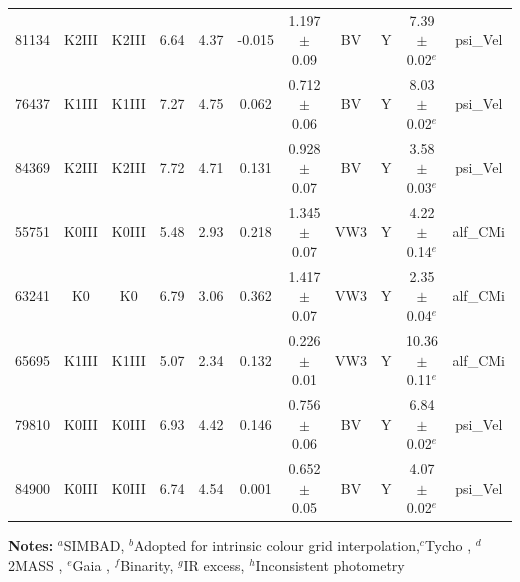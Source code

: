 \begin{tabular}{ccccccccccc}
81134 & K2III & K2III & 6.64 & 4.37 & -0.015 & 1.197 $\pm$ 0.09 & BV & Y & 7.39 $\pm$ 0.02$^e$ &psi_Vel\\
76437 & K1III & K1III & 7.27 & 4.75 & 0.062 & 0.712 $\pm$ 0.06 & BV & Y & 8.03 $\pm$ 0.02$^e$ &psi_Vel\\
84369 & K2III & K2III & 7.72 & 4.71 & 0.131 & 0.928 $\pm$ 0.07 & BV & Y & 3.58 $\pm$ 0.03$^e$ &psi_Vel\\
55751 & K0III & K0III & 5.48 & 2.93 & 0.218 & 1.345 $\pm$ 0.07 & VW3 & Y & 4.22 $\pm$ 0.14$^e$ &alf_CMi\\
63241 & K0 & K0 & 6.79 & 3.06 & 0.362 & 1.417 $\pm$ 0.07 & VW3 & Y & 2.35 $\pm$ 0.04$^e$ &alf_CMi\\
65695 & K1III & K1III & 5.07 & 2.34 & 0.132 & 0.226 $\pm$ 0.01 & VW3 & Y & 10.36 $\pm$ 0.11$^e$ &alf_CMi\\
79810 & K0III & K0III & 6.93 & 4.42 & 0.146 & 0.756 $\pm$ 0.06 & BV & Y & 6.84 $\pm$ 0.02$^e$ &psi_Vel\\
84900 & K0III & K0III & 6.74 & 4.54 & 0.001 & 0.652 $\pm$ 0.05 & BV & Y & 4.07 $\pm$ 0.02$^e$ &psi_Vel\\
\hline
\end{tabular}
\begin{minipage}{\linewidth}
\vspace{0.1cm}
\textbf{Notes:} $^a$SIMBAD, $^b$Adopted for intrinsic colour grid interpolation,$^c$Tycho \citet{hog_tycho-2_2000}, $^d$2MASS \citet{skrutskie_two_2006}, $^e$Gaia \citet{brown_gaia_2018}, $^f$Binarity, $^g$IR excess, $^h$Inconsistent photometry\\
\end{minipage}
